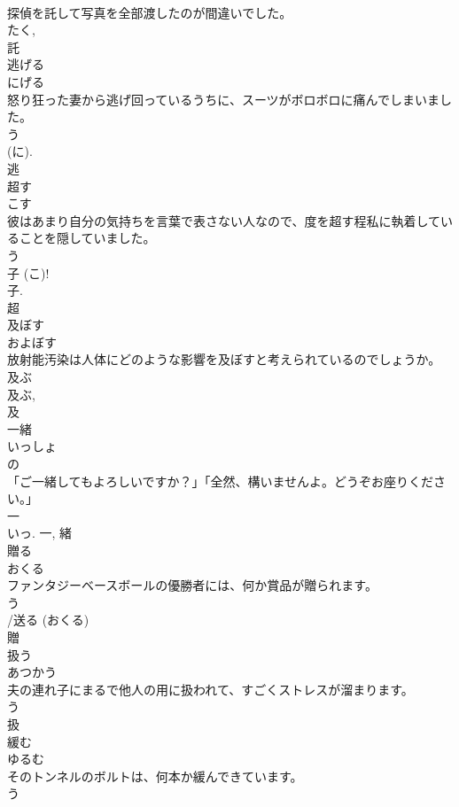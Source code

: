 \documentclass[8pt]{extreport}
\begin{document}
\begin{CJK}{UTF8}{min}
\\	探偵を託して写真を全部渡したのが間違いでした。	
\\	たく, 
\\	託	
\\	逃げる	
\\	にげる	
\\	怒り狂った妻から逃げ回っているうちに、スーツがボロボロに痛んでしまいました。	
\\	う 
\\	(に). 
\\	逃	
\\	超す	
\\	こす	
\\	彼はあまり自分の気持ちを言葉で表さない人なので、度を超す程私に執着していることを隠していました。	
\\	う 
\\	子 (こ)! 
\\	子. 
\\	超	
\\	及ぼす	
\\	およぼす	
\\	放射能汚染は人体にどのような影響を及ぼすと考えられているのでしょうか。	
\\	及ぶ 
\\	及ぶ, 
\\	及	
\\	一緒	
\\	いっしょ	
\\	の 
\\	「ご一緒してもよろしいですか？」「全然、構いませんよ。どうぞお座りください。」	
\\	一 
\\	いっ.	一, 緒	
\\	贈る	
\\	おくる	
\\	ファンタジーベースボールの優勝者には、何か賞品が贈られます。	
\\	う 
\\	/送る (おくる) 
\\	贈	
\\	扱う	
\\	あつかう	
\\	夫の連れ子にまるで他人の用に扱われて、すごくストレスが溜まります。	
\\	う 
\\	扱	
\\	緩む	
\\	ゆるむ	
\\	そのトンネルのボルトは、何本か緩んできています。	
\\	う 

\end{CJK}
\end{document}
